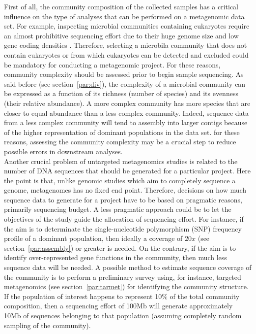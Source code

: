 First of all, the community composition of the collected samples has a critical influence on the type of analyses that can be performed on a metagenomic data set. For example, inspecting microbial communities containing eukaryotes require an almost prohibitive sequencing effort due to their huge genome size and low gene coding densities \cite{thomas1971genetic}. Therefore, selecting a microbila community that does not contain eukaryotes or from which eukaryotes can be detected and excluded could be mandatory for conducting a metagenomic project. For these reasons, community complexity should be assessed prior to begin sample sequencing. As said before (see section~\ref{par:div}), the complexity of a microbial community can be expressed as a function of its richness (number of species) and its evenness (their relative abundance). A more complex community has more species that are closer to equal abundance than a less complex community. Indeed, sequence data from a less complex community will tend to assembly into larger contigs because of the higher representation of dominant populations in the data set. for these reasons, assessing the community complexity may be a crucial step to reduce possible errors in downstream analyses.\\
Another crucial problem of untargeted metagenomics studies is related to the number of DNA sequences that should be generated for a particular project. Here the point is that, unlike genomic studies which aim to completely sequence a genome, metagenomes has no fixed end point. Therefore, decisions on how much sequence data to generate for a project have to be based on pragmatic reasons, primarily sequencing budget. A less pragmatic approach could be to let the objectives of the study guide the allocation of sequencing effort. For instance, if the aim is to determinate the single-nucleotide polymorphism (SNP) frequency profile of a dominant population, then ideally a coverage of $20x$ (see section~\ref{par:assembly}) or greater is needed. On the contrary, if the aim is to identify over-represented gene functions in the community, then much less sequence data will be needed. A possible method to estimate sequence coverage of the community is to perform a preliminary survey using, for instance, targeted metagenomics (see section~\ref{par:tarmet}) for identifying the community structure. If the population of interest happens to represent 10\% of the total community composition, then a sequencing effort of 100Mb will generate approximately 10Mb of sequences belonging to that population (assuming completely random sampling of the community).\\
